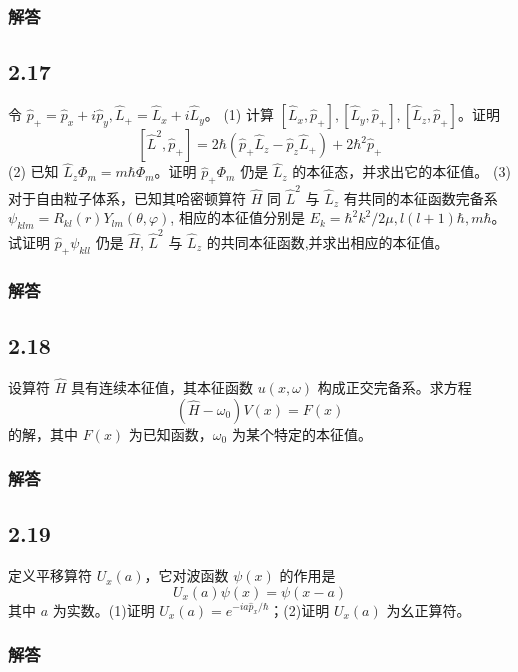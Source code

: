 \subsubsection{解答}

\newpage
\subsection{2.17}
令 $\hat{p}_+ = \hat{p}_x + i \hat{p}_y, \hat{L}_+ = \hat{L}_x + i \hat{L}_y$。
(1) 计算 $[\hat{L}_x, \hat{p}_+], [\hat{L}_y, \hat{p}_+], [\hat{L}_z, \hat{p}_+]$。证明$$[\hat{L}^2, \hat{p}_+] = 2 \hbar (\hat{p}_+ \hat{L}_z - \hat{p}_z \hat{L}_+ ) + 2 \hbar^2 \hat{p}_+$$
(2) 已知 $\hat{L}_z \Phi_m = m \hbar \Phi_m$。证明 $\hat{p}_+ \Phi_m$ 仍是 $\hat{L}_z$ 的本征态，并求出它的本征值。
(3) 对于自由粒子体系，已知其哈密顿算符 $\hat{H}$ 同 $\hat{L}^2$ 与 $\hat{L}_z$ 有共同的本征函数完备系 $\psi_{klm} = R_{kl}(r) Y_{lm}(\theta, \varphi)$, 相应的本征值分别是 $E_k = \hbar^2 k^2 / 2\mu, l(l+1)\hbar, m\hbar$。试证明 $\hat{p}_+ \psi_{kll}$ 仍是 $\hat{H}$, $\hat{L}^2$ 与 $\hat{L}_z$ 的共同本征函数,并求出相应的本征值。

\subsubsection{解答}

\newpage
\subsection{2.18}
设算符 $\hat{H}$ 具有连续本征值，其本征函数 $u(x, \omega)$ 构成正交完备系。求方程
$$(\hat{H} - \omega_0)V(x) = F(x)$$
的解，其中 $F(x)$ 为已知函数，$\omega_0$ 为某个特定的本征值。

\subsubsection{解答}

\newpage
\subsection{2.19}
定义平移算符 $U_x(a)$，它对波函数 $\psi(x)$ 的作用是
$$U_x(a)\psi(x) = \psi(x-a)$$
其中 $a$ 为实数。(1)证明 $U_x(a) = e^{-i a \hat{p}_x / \hbar}$；(2)证明 $U_x(a)$ 为幺正算符。

\subsubsection{解答}

